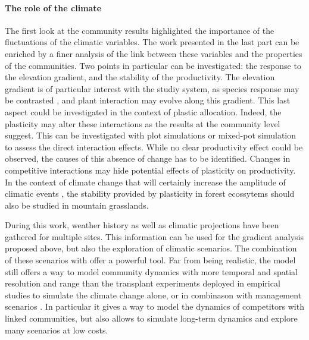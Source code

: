 \paragraph{The role of the climate}

The first look at the community results highlighted the importance of the fluctuations of the climatic variables. The work presented in the last part can be enriched by a finer analysis of the link between these variables and the properties of the communities. Two points in particular can be investigated: the response to the elevation gradient, and the stability of the productivity. The elevation gradient is of particular interest with the studiy system, as species response may be contrasted  \parencite{kichenin_contrasting_2013}, and plant interaction may evolve \parencite{choler_facilitation_2001, callaway_positive_2002} along this gradient. This last aspect could be investigated in the context of plastic allocation. Indeed, the plasticity may alter these interactions as the results at the community level suggest. This can be investigated with plot simulations or mixed-pot simulation to assess the direct interaction effects. While no clear productivity effect could be observed, the causes of this absence of change has to be identified. Changes in competitive interactions may hide potential effects of plasticity on productivity. In the context of climate change that will certainly increase the amplitude of climatic events \parencite{gobiet_21st_2014}, the stability provided by plasticity in forest ecossytems \parencite{morin_temporal_2014} should also be studied in mountain grasslands.

During this work, weather history as well as climatic projections have been gathered for multiple sites. This information can be used for the gradient analysis proposed above, but also the exploration of climatic scenarios. The combination of these scenarios \parencite{intergovernmental_panel_on_climate_change_climate_2014} with \model offer a powerful tool. Far from being realistic, the model still offers a way to model community dynamics with more temporal and spatial resolution and range than the transplant experiments deployed in empirical studies \parencite{ishizuka_modeling_2012, wang_asymmetric_2014, grassein_importance_2014, hamann_evidence_2016} to simulate the climate change alone, or in combinason with management scenarios \parencite{deleglise_drought-induced_2015}. In particular it gives a way to model the dynamics of competitors \parencite{alexander_novel_2015} with linked communities, but also allows to simulate long-term dynamics and explore many scenarios at low costs.

